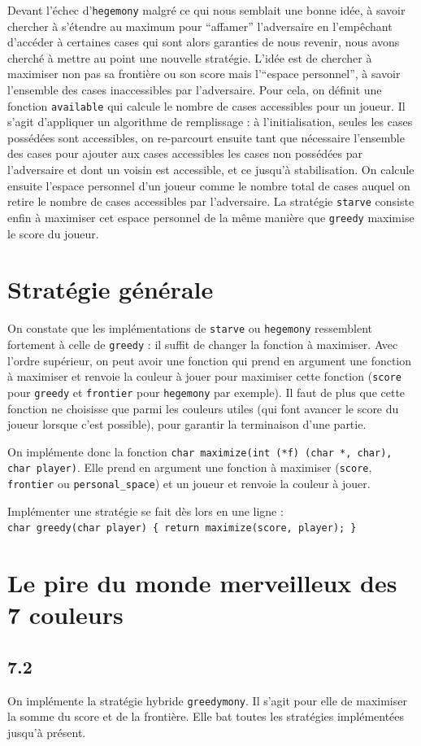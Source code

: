 \documentclass[12pt]{article}
\def\question#1{\subsection*{#1}}
\def\sec#1{\section{#1}}
\begin{document}
Devant l'échec d'\texttt{hegemony} malgré ce qui nous semblait une bonne idée, à savoir chercher à s'étendre au maximum pour ``affamer'' l'adversaire en l'empêchant d'accéder à certaines cases qui sont alors garanties de nous revenir, nous avons cherché à mettre au point une nouvelle stratégie. L'idée est de chercher à maximiser non pas sa frontière ou son score mais l'``espace personnel'', à savoir l'ensemble des cases inaccessibles par l'adversaire. Pour cela, on définit une fonction \texttt{available} qui calcule le nombre de cases accessibles pour un joueur. Il s'agit d'appliquer un algorithme de remplissage : à l'initialisation, seules les cases possédées sont accessibles, on re-parcourt ensuite tant que nécessaire l'ensemble des cases pour ajouter aux cases accessibles les cases non possédées par l'adversaire et dont un voisin est accessible, et ce jusqu'à stabilisation. On calcule ensuite l'espace personnel d'un joueur comme le nombre total de cases auquel on retire le nombre de cases accessibles par l'adversaire. La stratégie \texttt{starve} consiste enfin à maximiser cet espace personnel de la même manière que \texttt{greedy} maximise le score du joueur.

\sec{Stratégie générale}
On constate que les implémentations de \texttt{starve} ou \texttt{hegemony} ressemblent fortement à celle de \texttt{greedy} : il suffit de changer la fonction à maximiser. Avec l'ordre supérieur, on peut avoir une fonction qui prend en argument une fonction à maximiser et renvoie la couleur à jouer pour maximiser cette fonction (\texttt{score} pour \texttt{greedy} et \texttt{frontier} pour \texttt{hegemony} par exemple). Il faut de plus que cette fonction ne choisisse que parmi les couleurs utiles (qui font avancer le score du joueur lorsque c'est possible), pour garantir la terminaison d'une partie.

On implémente donc la fonction \texttt{char maximize(int (*f) (char *, char), char player)}. Elle prend en argument une fonction à maximiser (\texttt{score}, \texttt{frontier} ou \texttt{personal\_space}) et un joueur et renvoie la couleur à jouer.

Implémenter une stratégie se fait dès lors en une ligne :\\
\texttt{char greedy(char player) \{ return maximize(score, player); \}}


\sec{Le pire du monde merveilleux des 7 couleurs}
\question{7.2}
On implémente la stratégie hybride \texttt{greedymony}. Il s'agit pour elle de maximiser la somme du score et de la frontière. Elle bat toutes les stratégies implémentées jusqu'à présent.
\end{document}
